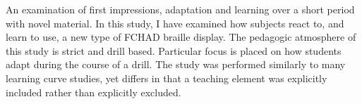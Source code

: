 An examination of first impressions, adaptation and learning over a short period with novel material.  In this study, I have examined how subjects react to, and learn to use, a new type of FCHAD braille display.  The pedagogic atmosphere of this study is strict and drill based.  Particular focus is placed on how students adapt during the course of a drill.  The study was performed similarly to many learning curve studies, yet differs in that a teaching element was explicitly included rather than explicitly excluded.
